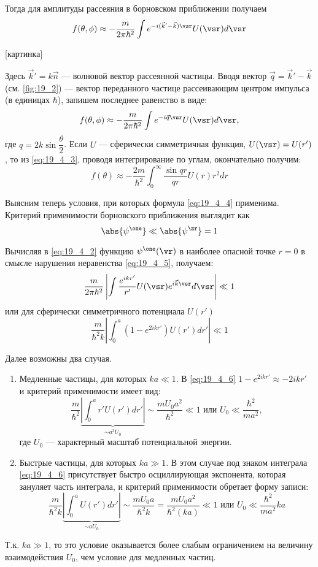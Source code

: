 Тогда для амплитуды рассеяния в борновском приближении получаем
$$
f(\theta, \phi) \approx  -\frac{m}{2\pi \hbar^2} \int e^{-i(\vec{k}'-\vec{k})\vsr} U(\vsr) d\vsr
$$

[картинка]

Здесь $\vec{k}' = k \vec{n}$ --- волновой вектор рассеянной частицы. Вводя вектор $\vec{q} = \vec{k}'- \vec{k}$ (см. \autoref{fig:19_2}) --- вектор переданного частице рассеивающим центром импульса (в единицах $\hbar$), запишем последнее равенство в виде:
\begin{equation}
\label{eq:19_4_3}
f(\theta, \phi) \approx  -\frac{m}{2\pi \hbar^2} \int e^{-i \vec{q}\vsr} U(\vsr) d\vsr,
\end{equation}
где $q = 2k \sin \dfrac{\theta}{2}$. Если $U$ --- сферически симметричная функция, $U(\vsr) = U(r')$, то из \eqref{eq:19_4_3}, проводя интегрирование по углам, окончательно получим:
\begin{equation}
\label{eq:19_4_4}
f(\theta) \approx -\frac{2m}{\hbar^2} \int_0^\infty \frac{\sin qr}{qr}U(r)r^2 dr
\end{equation}

Выясним теперь условия, при которых формула \eqref{eq:19_4_4} применима. Критерий применимости борновского приближения выглядит как
\begin{equation}
\label{eq:19_4_5}
\abs{\psi^\one} \ll \abs{\psi^\zr} = 1
\end{equation}

Вычисляя в \eqref{eq:19_4_2} функцию $\psi^\one(\vr)$ в наиболее опасной точке $r = 0$ в смысле нарушения неравенства \eqref{eq:19_4_5}, получаем:
$$
\frac{m}{2 \pi \hbar^2} \left| \int \frac{e^{ikr'}}{r'} U(\vsr) e^{i\vec{k} \vsr}d\vsr\right | \ll 1
$$
или для сферически симметричного потенциала $U(r')$
\begin{equation}
\label{eq:19_4_6}
\boxed{\frac{m}{\hbar^2 k} \left| \int_0^a (1 - e^{2ikr'}) U(r') dr'\right | \ll 1}
\end{equation}

Далее возможны два случая.

\begin{enumerate}
\item Медленные частицы, для которых $ka \ll 1$. В \eqref{eq:19_4_6} $1-e^{2ik r'} \approx -2ikr'$ и критерий применимости имеет вид:
$$
\frac{m}{\hbar^2} \underbrace{\left| \int_0^a r' U(r') dr' \right|}_{\sim a^2 U_0} \sim \frac{m U_0 a^2}{\hbar^2} \ll 1 \text{ или } \boxed{U_0 \ll \frac{\hbar^2}{ma^2}},
$$
где $U_0$ --- характерный масштаб потенциальной энергии.

\item Быстрые частицы, для которых $ka \gg 1$. В этом случае под знаком интеграла \eqref{eq:19_4_6} присутствует быстро осциллирующая экспонента, которая зануляет часть интеграла, и критерий применимости обретает форму записи:
$$
\frac{m}{\hbar^2 k} \underbrace{\left| \int_0^a U(r') dr'\right |}_{\sim a U_0} \sim \frac{m U_0 a}{\hbar^2 k} = \frac{m U_0 a^2}{\hbar^2 (ka)} \ll 1 \text{ или } \boxed{U_0 \ll \frac{\hbar^2}{ma^2} ka}
$$
\end{enumerate}

Т.к. $ka \gg 1$, то это условие оказывается более слабым ограничением на величину взаимодействия $U_0$, чем условие для медленных частиц.
